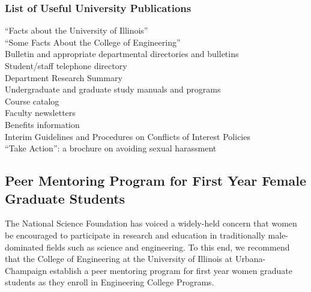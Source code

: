 \newpage

\subsubsection{List of Useful University Publications}

\noindent
		``Facts about the University of Illinois''\\
		``Some Facts About the College of Engineering''\\
		Bulletin and appropriate departmental directories and bulletins \\
		Student/staff telephone directory\\
		Department Research Summary \\
		Undergraduate and graduate study manuals and programs\\
		Course catalog \\
		Faculty newsletters\\ 
		Benefits information\\
		Interim Guidelines and Procedures on Conflicts of Interest Policies\\
		``Take Action'': a brochure on avoiding sexual harassment \\




\subsection{Peer Mentoring Program for First Year
Female Graduate Students}


        The National Science Foundation has
  voiced a widely-held concern that women
be encouraged to participate in research and education in traditionally
male-dominated fields such as science and engineering. To this end, we
recommend that the College of Engineering at the University of Illinois at
Urbana-Champaign establish a peer mentoring program for first year women
graduate students as they enroll in Engineering College Programs.


